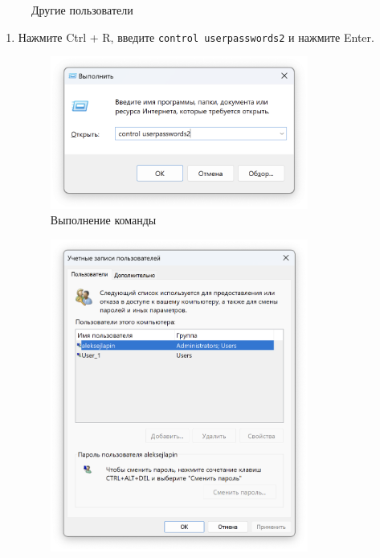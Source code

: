 \documentclass[a4paper, 14pt]{report}
\begin{document}
\begin{enumerate}
{\begin{figure}[H]
              \caption{Другие пользователи}
          \end{figure}
          }
\end{enumerate}

\begin{enumerate}
    \item { Нажмите Ctrl + R, введите \texttt{control userpasswords2} и нажмите Enter.
          \begin{figure}[H]
              \centering
              \includegraphics[width=0.8\textwidth]{../images/execute_command.png}
              \caption{Выполнение команды}
          \end{figure}
          \begin{figure}[H]
              \centering
              \includegraphics[width=0.8\textwidth]{../images/control_userpasswords2.png}

\end{figure}}
\end{enumerate}
\end{document}
